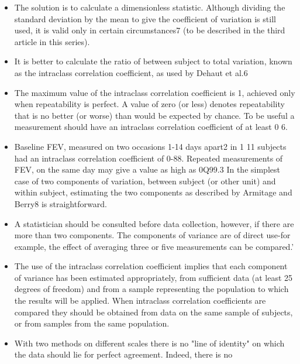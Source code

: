 \documentclass[MAIN.tex]{subfiles}
\begin{document}
\begin{itemize}
\item The solution
is to calculate a dimensionless statistic.
Although dividing the standard deviation by
the mean to give the coefficient of variation is
still used, it is valid only in certain circumstances7
(to be described in the third article in
this series). 

\item  It is better to calculate the ratio of
between subject to total variation, known as the intraclass correlation coefficient, as used by
Dehaut et al.6 

\item The maximum value of the
intraclass correlation coefficient is 1, achieved
only when repeatability is perfect. A value of zero (or less) denotes repeatability that is no
better (or worse) than would be expected by chance. To be useful a measurement should
have an intraclass correlation coefficient of at least 0 6. 
\item Baseline FEV, measured on two
occasions 1-14 days apart2 in 1 11 subjects had
an intraclass correlation coefficient of 0-88.
Repeated measurements of FEV, on the same day may give a value as high as 0Q99.3 In the
simplest case of two components of variation,
between subject (or other unit) and within subject, estimating the two components as
described by Armitage and Berry8 is straightforward.

\item A statistician should be consulted
before data collection, however, if there are more than two components. The components
of variance are of direct use-for example, the effect of averaging three or five measurements
can be compared.'

\item The use of the intraclass correlation coefficient
implies that each component of
variance has been estimated appropriately, from sufficient data (at least 25 degrees of
freedom) and from a sample representing the population to which the results will be applied.
When intraclass correlation coefficients are compared they should be obtained from data on
the same sample of subjects, or from samples from the same population.
\item With two methods on different scales there is no "line of identity" on which the data should
lie for perfect agreement. Indeed, there is no
\end{itemize}
\end{document}
